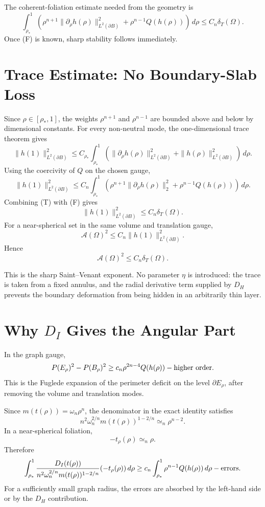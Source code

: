 \documentclass[11pt]{article}
\begin{document}
The coherent-foliation estimate needed from the geometry is
\[
\boxed{
\int_{\rho_*}^1
\left(
\rho^{n+1}\|\partial_\rho h(\rho)\|_{L^2(\partial B)}^2
+\rho^{n-1}Q(h(\rho))
\right)\,d\rho
\le
C_n\delta_T(\Omega).
}
\tag{F}
\]
Once (F) is known, sharp stability follows immediately.

\section{Trace Estimate: No Boundary-Slab Loss}

Since \(\rho\in[\rho_*,1]\), the weights \(\rho^{n+1}\) and \(\rho^{n-1}\) are
bounded above and below by dimensional constants. For every non-neutral mode,
the one-dimensional trace theorem gives
\[
\|h(1)\|_{L^2(\partial B)}^2
\le
C_{\rho_*}
\int_{\rho_*}^1
\left(
\|\partial_\rho h(\rho)\|_{L^2(\partial B)}^2
+\|h(\rho)\|_{L^2(\partial B)}^2
\right)\,d\rho.
\]
Using the coercivity of \(Q\) on the chosen gauge,
\[
\boxed{
\|h(1)\|_{L^2(\partial B)}^2
\le
C_n
\int_{\rho_*}^1
\left(
\rho^{n+1}\|\partial_\rho h(\rho)\|_2^2
+\rho^{n-1}Q(h(\rho))
\right)\,d\rho.
}
\tag{T}
\]
Combining (T) with (F) gives
\[
\|h(1)\|_{L^2(\partial B)}^2\le C_n\delta_T(\Omega).
\]
For a near-spherical set in the same volume and translation gauge,
\[
\mathcal A(\Omega)^2\le C_n\|h(1)\|_{L^2(\partial B)}^2.
\]
Hence
\[
\boxed{
\mathcal A(\Omega)^2\le C_n\delta_T(\Omega).
}
\]

This is the sharp Saint--Venant exponent. No parameter \(\eta\) is introduced:
the trace is taken from a fixed annulus, and the radial derivative term
supplied by \(D_H\) prevents the boundary deformation from being hidden in an
arbitrarily thin layer.

\section{Why \(D_I\) Gives the Angular Part}

In the graph gauge,
\[
P(E_\rho)^2-P(B_\rho)^2
\ge
c_n\rho^{2n-4}Q(h(\rho))
-\hbox{higher order}.
\]
This is the Fuglede expansion of the perimeter deficit on the level
\(\partial E_\rho\), after removing the volume and translation modes.

Since \(m(t(\rho))=\omega_n\rho^n\), the denominator in the exact identity
satisfies
\[
n^2\omega_n^{2/n}m(t(\rho))^{1-2/n}\simeq_n \rho^{n-2}.
\]
In a near-spherical foliation,
\[
-t_\rho(\rho)\simeq_n \rho.
\]
Therefore
\[
\int_{\rho_*}^1
\frac{D_I(t(\rho))}
{n^2\omega_n^{2/n}m(t(\rho))^{1-2/n}}
(-t_\rho(\rho))\,d\rho
\ge
c_n
\int_{\rho_*}^1
\rho^{n-1}Q(h(\rho))\,d\rho
-\hbox{errors}.
\]
For a sufficiently small graph radius, the errors are absorbed by the left-hand
side or by the \(D_H\) contribution.
\end{document}
